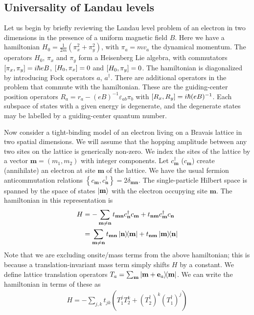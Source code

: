 \documentclass[aps,prb,twocolumn,letterpaper,twoside,nobalancelastpage,groupedaddress,amsmath,amssymb,floatfix,citeautoscript]{revtex4-1}
\begin{document}
\subsection{Universality of Landau levels}
\label{landau-levels}
Let us begin by briefly reviewing the Landau level problem of an electron in two dimensions in the presence of a uniform magnetic field $B$\cite{YoshiokaBook}. Here we have a hamiltonian $H_0 = \frac{1}{2m}\left(\pi_x^2 + \pi_y^2\right)$, with $\pi_a = m v_a$ the dynamical momentum. The operators $H_0$, $\pi_x$ and $\pi_y$ form a Heisenberg Lie algebra, with commutators $\comm{\pi_x}{\pi_y} = i\hbar e B$, $\comm{H_0}{\pi_x} = 0$ and $\comm{H_0}{\pi_y} = 0$. The hamiltonian is diagonalized by introducing Fock operators $a$, $a^{\dagger}$. There are additional operators in the problem that commute with the hamiltonian. These are the guiding-center position operators $R_a = r_a - (eB)^{-1}\varepsilon_{ab}\pi_b$ with $\comm{R_x}{R_y} = i\hbar(eB)^{-1}$. Each subspace of states with a given energy is degenerate, and the degenerate states may be labelled by a guiding-center quantum number.

Now consider a tight-binding model of an electron living on a Bravais lattice in two spatial dimensions. 
We will assume that the hopping amplitude between any two sites on the lattice is generically non-zero. We index the sites of the lattice by a vector $\mathbf{m} = (m_1, m_2)$ with integer components. Let $c^{\dag}_{\mathbf{m}}$ ($c_{\mathbf{m}}$) create (annihilate) an electron at site $\mathbf{m}$ of the lattice. We have the usual fermion anticommutation relations $\left\{c_{\mathbf{m}},c_{\mathbf{n}}^{\dag}\right\} = 2\delta_{\mathbf{m} \mathbf{n}}$. The single-particle Hilbert space is spanned by the space of states $\ket{\mathbf{m}}$ with the electron occupying site $\mathbf{m}$. The hamiltonian in this representation is
\begin{align*}
H &= -\sum_{\mathbf{m}\neq \mathbf{n}} t_{\mathbf{m}\mathbf{n}} c^{\dag}_\mathbf{n} c_\mathbf{m}  + t_{\mathbf{n}\mathbf{m}} c^{\dag}_{\mathbf{m}} c_{\mathbf{n}}\\  &= \sum_{\mathbf{m}\neq \mathbf{n}} t_{\mathbf{m}\mathbf{n}} \dyad{\mathbf{n}}{\mathbf{m}} + t_{\mathbf{n}\mathbf{m}} \dyad{\mathbf{m}}{\mathbf{n}}
\end{align*}
Note that we are excluding onsite/mass terms from the above hamiltonian; this is because a translation-invariant mass term simply shifts $H$ by a constant. We define lattice translation operators $T_a = \sum_{\bfm} \dyad{\mathbf{m} + \mathbf{e}_a}{\mathbf{m}}$. We can write the hamiltonian in terms of these as
\begin{align}
\label{eq-b0-lattice-hamiltonian}
H = -\sum_{j,k} t_{jk} \left(T_1^j T_2^k + (T^{\dag}_2)^{k} (T^{\dag}_1)^{j}\right)
\end{align}
\end{document}

